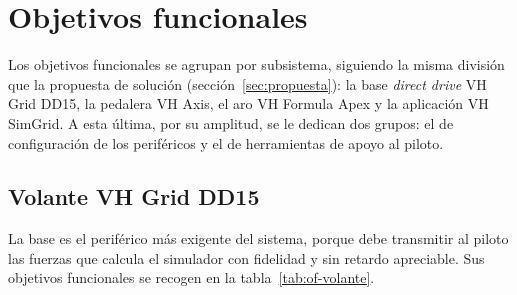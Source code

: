 \section{Objetivos funcionales}
\label{sec:objetivos-funcionales}

Los objetivos funcionales se agrupan por subsistema, siguiendo la misma división que la propuesta de solución (sección~\ref{sec:propuesta}): la base \emph{direct drive} VH Grid DD15, la pedalera VH Axis, el aro VH Formula Apex y la aplicación VH SimGrid. A esta última, por su amplitud, se le dedican dos grupos: el de configuración de los periféricos y el de herramientas de apoyo al piloto.

\subsection{Volante VH Grid DD15}
\label{subsec:of-volante}

La base es el periférico más exigente del sistema, porque debe transmitir al piloto las fuerzas que calcula el simulador con fidelidad y sin retardo apreciable. Sus objetivos funcionales se recogen en la tabla~\ref{tab:of-volante}.

